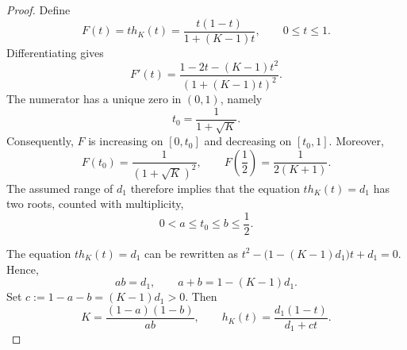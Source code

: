 \documentclass[11pt]{article}
\numberwithin{equation}{section}
\theoremstyle{definition}
\theoremstyle{remark}
\begin{document}
\begin{proof}
Define
\begin{equation*}
 F(t)=t h_K(t)
     =\frac{t(1-t)}{1+(K-1)t},
 \qquad 0\leq t\leq1.
\end{equation*}
Differentiating gives
\begin{equation*}
 F'(t)
 =
 \frac{1-2t-(K-1)t^2}
      {(1+(K-1)t)^2}.
\end{equation*}
The numerator has a unique zero in $(0,1)$, namely
\begin{equation*}
 t_0=\frac{1}{1+\sqrt K}.
\end{equation*}
Consequently, $F$ is increasing on $[0,t_0]$ and decreasing on
$[t_0,1]$. Moreover,
\begin{equation*}
 F(t_0)=\frac{1}{(1+\sqrt K)^2},
 \qquad
 F\left(\frac12\right)=\frac{1}{2(K+1)}.
\end{equation*}
The assumed range of $d_1$ therefore implies that the equation
$
 t h_K(t)=d_1
$
has two roots, counted with multiplicity,
\begin{equation*}
 0<a\leq t_0\leq b\leq\frac12.
\end{equation*}

The equation $t h_K(t)=d_1$ can be rewritten as
$
 t^2-\bigl(1-(K-1)d_1\bigr)t+d_1=0.
$
Hence,
\begin{equation*}
 ab=d_1,
 \qquad
 a+b=1-(K-1)d_1.
\end{equation*}
Set
$
 c:=1-a-b=(K-1)d_1>0.
$
Then
\begin{equation*}
 K=\frac{(1-a)(1-b)}{ab},\qquad
 h_K(t)
 =
 \frac{d_1(1-t)}{d_1+ct}.
\end{equation*}


\end{proof}
\end{document}

